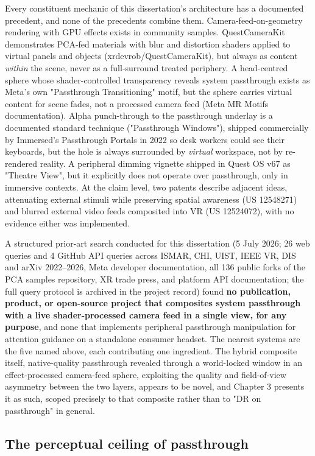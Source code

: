 Every constituent mechanic of this dissertation's architecture has a documented precedent, and none
of the precedents combine them. Camera-feed-on-geometry rendering with GPU effects exists in
community samples. QuestCameraKit demonstrates PCA-fed materials with blur and distortion shaders
applied to virtual panels and objects (xrdevrob/QuestCameraKit), but always as content \textit{within}
the scene, never as a full-surround treated periphery. A head-centred sphere whose shader-controlled
transparency reveals system passthrough exists as Meta's own "Passthrough Transitioning" motif, but
the sphere carries virtual content for scene fades, not a processed camera feed (Meta MR Motifs
documentation). Alpha punch-through to the passthrough underlay is a documented standard technique
("Passthrough Windows"), shipped commercially by Immersed's Passthrough Portals in 2022 so desk
workers could see their keyboards, but the hole is always surrounded by \textit{virtual} workspace, not by
re-rendered reality. A peripheral dimming vignette shipped in Quest OS v67 as "Theatre View", but it
explicitly does not operate over passthrough, only in immersive contexts. At the claim level, two
patents describe adjacent ideas, attenuating external stimuli while preserving spatial awareness
(US 12548271) and blurred external video feeds composited into VR (US 12524072), with no evidence
either was implemented.

A structured prior-art search conducted for this dissertation (5 July 2026; 26 web queries and 4
GitHub API queries across ISMAR, CHI, UIST, IEEE VR, DIS and arXiv 2022–2026, Meta developer
documentation, all 136 public forks of the PCA samples repository, XR trade press, and platform API
documentation; the full query protocol is archived in the project record) found \textbf{no publication,
product, or open-source project that composites system passthrough with a live shader-processed
camera feed in a single view, for any purpose}, and none that implements peripheral passthrough
manipulation for attention guidance on a standalone consumer headset. The nearest systems are the
five named above, each contributing one ingredient. The hybrid composite itself, native-quality
passthrough revealed through a world-locked window in an effect-processed camera-feed sphere,
exploiting the quality and field-of-view asymmetry between the two layers, appears to be novel, and
Chapter 3 presents it as such, scoped precisely to that composite rather than to "DR on passthrough"
in general.

\subsection{The perceptual ceiling of passthrough}

